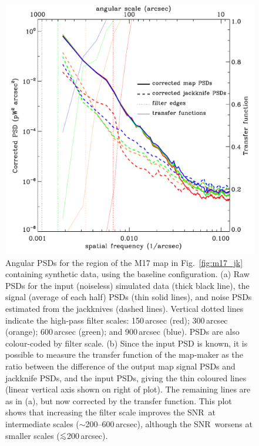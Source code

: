 \documentclass[useAMS,usenatbib,nofootinbib]{mn2e}
\newcommand{\snr}{SNR}
\def\lsim{\mathrel{\lower2.5pt\vbox{\lineskip=0pt\baselineskip=0pt
          \hbox{$<$}\hbox{$\sim$}}}}
\begin{document}
\begin{figure}
\begin{minipage}[h]{0.495\linewidth}
\includegraphics[width=\linewidth]{cor_pspec_m17_default}
\end{minipage}
\caption{Angular PSDs for the region of the M17 map in
Fig.~\ref{fig:m17_jk} containing synthetic data, using the baseline
configuration. (a) Raw PSDs for the input (noiseless) simulated data
(thick black line), the signal (average of each half) PSDs (thin solid
lines), and noise PSDs estimated from the jackknives (dashed
lines). Vertical dotted lines indicate the high-pass filter scales:
150\,arcsec (red); 300\,arcsec (orange); 600\,arcsec (green); and
900\,arcsec (blue). PSDs are also colour-coded by filter scale. (b)
Since the input PSD is known, it is possible to measure the transfer
function of the map-maker as the ratio between the difference of the
output map signal PSDs and jackknife PSDs, and the input PSDs, giving
the thin coloured lines (linear vertical axis shown on right of
plot). The remaining lines are as in (a), but now corrected by the
transfer function. This plot shows that increasing the filter scale
improves the \snr\ at intermediate scales ($\sim$200--600\,arcsec),
although the \snr\ worsens at smaller scales ($\lsim$200\,arcsec).}
\label{fig:m17_def_ps}
\end{figure}
\end{document}
